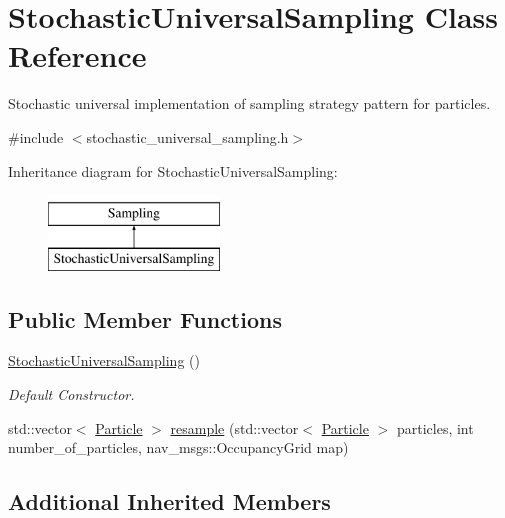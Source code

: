 \hypertarget{classStochasticUniversalSampling}{\section{Stochastic\-Universal\-Sampling Class Reference}
\label{classStochasticUniversalSampling}
}


Stochastic universal implementation of sampling strategy pattern for particles.  




{\ttfamily \#include $<$stochastic\-\_\-universal\-\_\-sampling.\-h$>$}

Inheritance diagram for Stochastic\-Universal\-Sampling\-:\begin{figure}[H]
\begin{center}
\leavevmode
\includegraphics[height=2.000000cm]{classStochasticUniversalSampling}
\end{center}
\end{figure}
\subsection*{Public Member Functions}
\begin{DoxyCompactItemize}
\item 
\hypertarget{classStochasticUniversalSampling_ac6d8388314fb9eec1341b6879eec4cca}{\hyperlink{classStochasticUniversalSampling_ac6d8388314fb9eec1341b6879eec4cca}{Stochastic\-Universal\-Sampling} ()}\label{classStochasticUniversalSampling_ac6d8388314fb9eec1341b6879eec4cca}

\begin{DoxyCompactList}\small\item\em Default Constructor. \end{DoxyCompactList}\item 
std\-::vector$<$ \hyperlink{classParticle}{Particle} $>$ \hyperlink{classStochasticUniversalSampling_aa46ab5185de58679355e388eb3e05d6d}{resample} (std\-::vector$<$ \hyperlink{classParticle}{Particle} $>$ particles, int number\-\_\-of\-\_\-particles, nav\-\_\-msgs\-::\-Occupancy\-Grid map)
\end{DoxyCompactItemize}
\subsection*{Additional Inherited Members}


